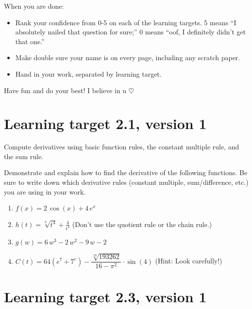 When you are done:
\begin{itemize}
    \item Rank your confidence from 0-5 on each of the learning targets. 5 means ``I absolutely nailed that question for sure;'' 0 means ``oof, I definitely didn't get that one.''
    \item Make double sure your name is on every page, including any scratch paper.
    \item Hand in your work, separated by learning target.
\end{itemize}

Have fun and do your best! I believe in u $\heartsuit$


\pagebreak

\section{Learning target 2.1, version 1}

Compute derivatives using basic function rules, the constant multiple rule, and the sum rule.

\hrulefill

Demonstrate and explain how to find the derivative of the following functions. Be sure to write down which derivative rules (constant multiple, sum/difference, etc.) you are using in your work.

\begin{enumerate}
    \item \(f(x) = 2 \, \cos\left(x\right) + 4 \, e^{x}\) 
    \vfill
    \item \(h(t) = \sqrt[3]{t^4} + \frac{4}{t^{4}}\) \quad (Don't use the quotient rule or the chain rule.)
    \vfill
    \item \(g(w) = 6 \, w^{3} - 2 \, w^{2} - 9 \, w - 2\)
    \vfill
    \item \(C(t) = 64(e^7 + 7^e)- \dfrac{\sqrt[27]{193262}}{16-\pi^2}\cdot\sin(4)\) \quad
(Hint: Look carefully!)
\end{enumerate}

\pagebreak

\section{Learning target 2.3, version 1}

